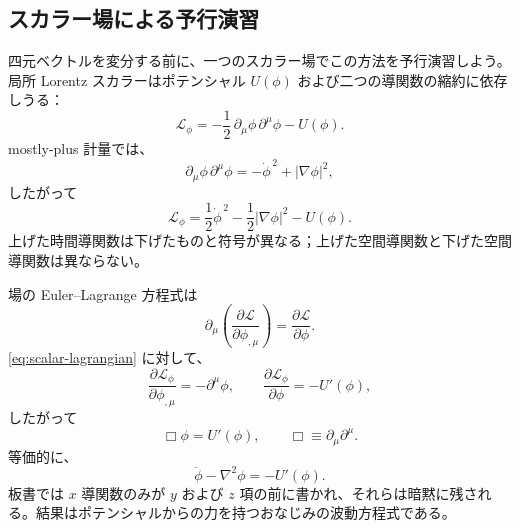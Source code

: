 \subsection{スカラー場による予行演習}

四元ベクトルを変分する前に、一つのスカラー場でこの方法を予行演習しよう。局所 Lorentz スカラーはポテンシャル \(U(\phi)\) および二つの導関数の縮約に依存しうる：
\begin{equation}
\mathcal L_\phi
=
-\frac12\,\partial_\mu\phi\,\partial^\mu\phi-U(\phi).
\label{eq:scalar-lagrangian}
\end{equation}
mostly-plus 計量では、
\begin{equation}
\partial_\mu\phi\,\partial^\mu\phi
=
-\dot\phi^{\,2}+|\nabla\phi|^2,
\end{equation}
したがって
\begin{equation}
\mathcal L_\phi
=
\frac12\dot\phi^{\,2}
-\frac12|\nabla\phi|^2
-U(\phi).
\end{equation}
上げた時間導関数は下げたものと符号が異なる；上げた空間導関数と下げた空間導関数は異ならない。

\begin{classroomqa}
\end{classroomqa}

場の Euler--Lagrange 方程式は
\begin{equation}
\partial_\mu\left(
\frac{\partial\mathcal L}{\partial\phi_{,\mu}}
\right)
=
\frac{\partial\mathcal L}{\partial\phi}.
\label{eq:field-el}
\end{equation}
\eqref{eq:scalar-lagrangian} に対して、
\begin{equation}
\frac{\partial\mathcal L_\phi}{\partial\phi_{,\mu}}
=
-\partial^\mu\phi,
\qquad
\frac{\partial\mathcal L_\phi}{\partial\phi}
=
-U'(\phi),
\end{equation}
したがって
\begin{equation}
\Box\phi=U'(\phi),
\qquad
\Box\equiv\partial_\mu\partial^\mu.
\end{equation}
等価的に、
\begin{equation}
\ddot\phi-\nabla^2\phi=-U'(\phi).
\label{eq:scalar-wave}
\end{equation}
板書では \(x\) 導関数のみが \(y\) および \(z\) 項の前に書かれ、それらは暗黙に残される。結果はポテンシャルからの力を持つおなじみの波動方程式である。

